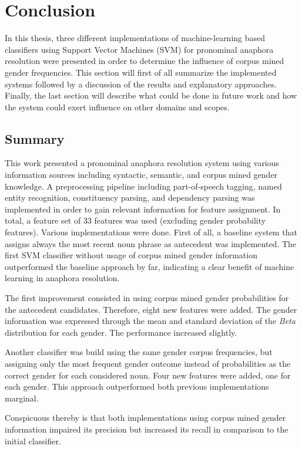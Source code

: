 \chapter{Conclusion}
\label{sec:Conclusion}
In this thesis, three different implementations of machine-learning based classifiers using Support Vector Machines (SVM) for pronominal anaphora resolution were presented in order to determine the influence of corpus mined gender frequencies. This section will first of all summarize the implemented systems followed by a discussion of the results and explanatory approaches. Finally, the last section will describe what could be done in future work and how the system could exert influence on other domains and scopes.

\section{Summary}
This work presented a pronominal anaphora resolution system using various information sources including syntactic, semantic, and corpus mined gender knowledge. A preprocessing pipeline including part-of-speech tagging, named entity recognition, constituency parsing, and dependency parsing was implemented in order to gain relevant information for feature assignment. In total, a feature set of 33 features was used (excluding gender probability features). Various implementations were done. First of all, a baseline system that assigns always the most recent noun phrase as antecedent was implemented. The first SVM classifier without usage of corpus mined gender information outperformed the baseline approach by far, indicating a clear benefit of machine learning in anaphora resolution. 

The first improvement consisted in using corpus mined gender probabilities for the antecedent candidates. Therefore, eight new features were added. The gender information was expressed through the mean and standard deviation of the \textit{Beta} distribution for each gender. The performance increased slightly. 

Another classifier was build using the same gender corpus frequencies, but assigning only the most frequent gender outcome instead of probabilities as the correct gender for each considered noun. Four new features were added, one for each gender. This approach outperformed both previous implementations marginal.

Conspicuous thereby is that both implementations using corpus mined gender information impaired its precision but increased its recall in comparison to the initial classifier. 

